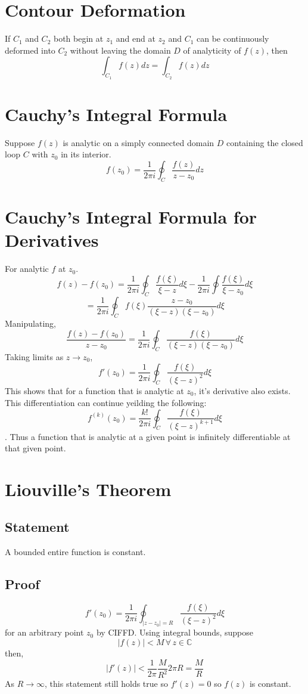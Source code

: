 \documentclass[../main.tex]{subfiles}
\begin{document}
\section{Contour Deformation}
If $C_{1}$ and $C_{2}$ both begin at $z_{1}$ and end at $z_{2}$ and $C_{1}$ can be continuously deformed into $C_{2}$ 
without leaving the domain $D$ of analyticity of $f(z)$, then
$$\int_{C_{1}}f(z)dz=\int_{C_{2}}f(z)dz$$

\section{Cauchy's Integral Formula}
Suppose $f(z)$ is analytic on a simply connected domain $D$ containing the closed loop $C$ with $z_{0}$ in its interior.
$$f(z_{0})=\frac{1}{2\pi i}\oint_{C}\frac{f(z)}{z-z_{0}}dz$$

\section{Cauchy's Integral Formula for Derivatives}
For analytic $f$ at $z_{0}$.
$$f(z)-f(z_{0})=\frac{1}{2\pi i}\oint_{C}\frac{f(\xi)}{\xi -z}d\xi - \frac{1}{2\pi i}\oint \frac{f(\xi)}{\xi-z_{0}}d\xi$$
$$=\frac{1}{2\pi i}\oint_{C}f(\xi)\frac{z-z_{0}}{(\xi-z)(\xi-z_{0})}d\xi$$
Manipulating,
$$\frac{f(z)-f(z_{0})}{z-z_{0}}=\frac{1}{2\pi i}\oint_{C}\frac{f(\xi)}{(\xi-z)(\xi-z_{0})}d\xi$$
Taking limits as $z\rightarrow z_{0}$,
$$f'(z_{0})=\frac{1}{2\pi i}\oint_{C}\frac{f(\xi)}{(\xi-z)^{2}}d\xi$$
This shows that for a function that is analytic at $z_{0}$, it's derivative also exists. This differentiation can continue yeilding the following:
$$f^{(k)}(z_{0})=\frac{k!}{2\pi i}\oint_{C}\frac{f(\xi)}{(\xi-z)^{k+1}}d\xi$$.
Thus a function that is analytic at a given point is infinitely differentiable at that given point.

\section{Liouville's Theorem}
\subsection{Statement}
A bounded entire function is constant.

\subsection{Proof}
$$f'(z_{0})=\frac{1}{2\pi i}\oint_{|z-z_{0}|=R}\frac{f(\xi)}{(\xi-z)^{2}}d\xi$$
for an arbitrary point $z_{0}$ by CIFFD.
Using integral bounds, suppose
$$|f(z)|<M \,\forall\, z\in\mathbb{C}$$
then,
$$|f'(z)|<\frac{1}{2\pi}\frac{M}{R^{2}}2\pi R=\frac{M}{R}$$
As $R\rightarrow\infty$, this statement still holds true so $f'(z)=0$ so $f(z)$ is constant.
\end{document}
